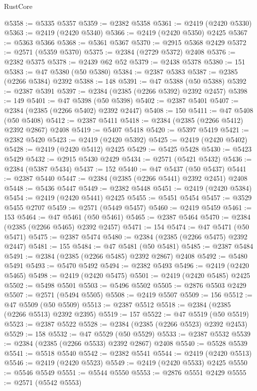 \begin{lexlean}{RustCore}
\begin{coremodule}
@5358 := @5335 @5357
@5359 := @2382 @5358
@5361 := @2419 (@2420 @5330)
@5363 := @2419 (@2420 @5340)
@5366 := @2419 (@2420 @5350) @2425
@5367 := @5363 @5366
@5368 := @5361 @5367
@5370 := @2915 @5368 @2429
@5372 := @2571 (@5359 @5370)
@5375 := @2384 (@2729 @5372) @2408
@5376 := @2382 @5375
@5378 := @2439 @62 @52
@5379 := @2438 @5378
@5380 := 151
@5383 := @47 @5380 (@50 @5380)
@5384 := @2387 @5383
@5387 := @2385 (@2266 @5384) @2392
@5388 := 148
@5391 := @47 @5388 (@50 @5388)
@5392 := @2387 @5391
@5397 := @2384 (@2385 (@2266 @5392) @2392 @2457)
@5398 := 149
@5401 := @47 @5398 (@50 @5398)
@5402 := @2387 @5401
@5407 := @2384 (@2385 (@2266 @5402) @2392 @2447)
@5408 := 150
@5411 := @47 @5408 (@50 @5408)
@5412 := @2387 @5411
@5418 := @2384 (@2385 (@2266 @5412) @2392 @2867) @2408
@5419 := @5407 @5418
@5420 := @5397 @5419
@5421 := @2382 @5420
@5423 := @2419 (@2420 @5392)
@5425 := @2419 (@2420 @5402)
@5428 := @2419 (@2420 @5412) @2425
@5429 := @5425 @5428
@5430 := @5423 @5429
@5432 := @2915 @5430 @2429
@5434 := @2571 (@5421 @5432)
@5436 := @2384 (@5387 @5434)
@5437 := 152
@5440 := @47 @5437 (@50 @5437)
@5441 := @2387 @5440
@5447 := @2384 (@2385 (@2266 @5441) @2392 @2451) @2408
@5448 := @5436 @5447
@5449 := @2382 @5448
@5451 := @2419 (@2420 @5384)
@5454 := @2419 (@2420 @5441) @2425
@5455 := @5451 @5454
@5457 := @3529 @5455 @2707
@5459 := @2571 (@5449 @5457)
@5460 := @2419 @5459
@5461 := 153
@5464 := @47 @5461 (@50 @5461)
@5465 := @2387 @5464
@5470 := @2384 (@2385 (@2266 @5465) @2392 @2457)
@5471 := 154
@5474 := @47 @5471 (@50 @5471)
@5475 := @2387 @5474
@5480 := @2384 (@2385 (@2266 @5475) @2392 @2447)
@5481 := 155
@5484 := @47 @5481 (@50 @5481)
@5485 := @2387 @5484
@5491 := @2384 (@2385 (@2266 @5485) @2392 @2867) @2408
@5492 := @5480 @5491
@5493 := @5470 @5492
@5494 := @2382 @5493
@5496 := @2419 (@2420 @5465)
@5498 := @2419 (@2420 @5475)
@5501 := @2419 (@2420 @5485) @2425
@5502 := @5498 @5501
@5503 := @5496 @5502
@5505 := @2876 @5503 @2429
@5507 := @2571 (@5494 @5505)
@5508 := @2419 @5507
@5509 := 156
@5512 := @47 @5509 (@50 @5509)
@5513 := @2387 @5512
@5518 := @2384 (@2385 (@2266 @5513) @2392 @2395)
@5519 := 157
@5522 := @47 @5519 (@50 @5519)
@5523 := @2387 @5522
@5528 := @2384 (@2385 (@2266 @5523) @2392 @2453)
@5529 := 158
@5532 := @47 @5529 (@50 @5529)
@5533 := @2387 @5532
@5539 := @2384 (@2385 (@2266 @5533) @2392 @2867) @2408
@5540 := @5528 @5539
@5541 := @5518 @5540
@5542 := @2382 @5541
@5544 := @2419 (@2420 @5513)
@5546 := @2419 (@2420 @5523)
@5549 := @2419 (@2420 @5533) @2425
@5550 := @5546 @5549
@5551 := @5544 @5550
@5553 := @2876 @5551 @2429
@5555 := @2571 (@5542 @5553)

\end{coremodule}
\end{lexlean}
